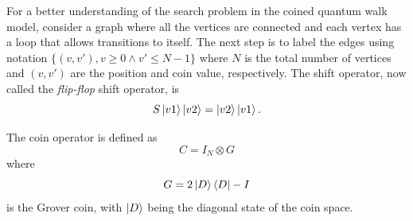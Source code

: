 \documentclass[../../dissertation.tex]{subfiles}
\begin{document}
For a better understanding of the search problem in the coined quantum walk
model, consider a graph where all the vertices are connected and each vertex
has a loop that allows transitions to itself.  The next step is to label the
edges using notation $\{(v,v'), v \geqslant 0 \land v' \leqslant N-1\}$ where
$N$ is the total number of vertices and $(v,v')$ are the position and coin
value, respectively.  The shift operator, now called the \textit{flip-flop} shift
operator, is
\begin{equation}
	S\ket{v1}\ket{v2} = \ket{v2}\ket{v1}.
	\label{eq:chap3FlipFlop}
\end{equation}\par
The coin operator is defined as
\begin{equation}
	C = I_N \otimes G
\end{equation}
where 
\begin{equation}
	G = 2\ket{D}\bra{D} - I
\end{equation}
is the Grover coin, with $\ket{D}$ being the diagonal state of the coin space.\par
\end{document}
